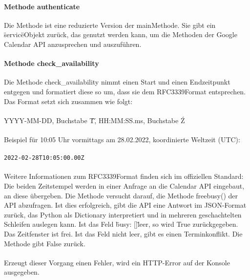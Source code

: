             
            \paragraph{Methode authenticate}
                Die Methode ist eine reduzierte Version der main\-Methode. Sie gibt ein \"service\"\-Objekt zurück, das genutzt werden kann, um die Methoden der Google Calendar API anzusprechen und auszuführen. 
      

            \paragraph{Methode check\_availability}
                Die Methode check\_availability nimmt einen Start\- und einen Endzeitpunkt entgegen und formatiert diese so um, dass sie dem RFC3339\-Format entsprechen. Das Format setzt sich zusammen wie folgt: \\
                \\
                YYYY-MM-DD, Buchstabe \'T\', HH:MM:SS.ms, Buchstabe \'Z\' \\
                \\
                Beispiel für 10:05 Uhr vormittags am 28.02.2022, koordinierte Weltzeit (UTC): \\
                \\
                \verb/2022-02-28T10:05:00.00Z/ \\
                \\
                Weitere Informationen zum RFC3339\-Format finden sich im offiziellen Standard: \cite{DateTime} \\

                Die beiden Zeitstempel werden in einer Anfrage an die Calendar API eingebaut, an diese übergeben. Die Methode versucht darauf, die Methode freebusy() der API abzufragen. Ist dies erfolgreich, gibt die API eine Antwort im JSON-Format zurück, das Python als Dictionary interpretiert und in mehreren geschachtelten Schleifen auslegen kann. Ist das Feld \"busy: []\" leer, so wird True zurückgegeben. Das Zeitfenster ist frei. Ist das Feld nicht leer, gibt es einen Terminkonflikt. Die Methode gibt False zurück. \\
                \\
                Erzeugt dieser Vorgang einen Fehler, wird ein HTTP-Error auf der Konsole ausgegeben. 


